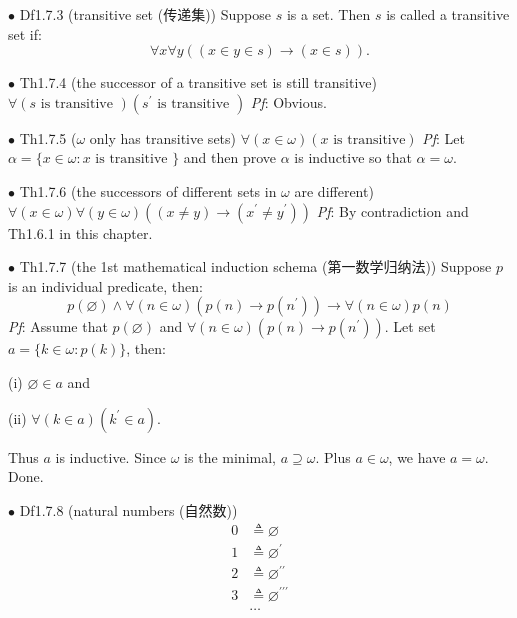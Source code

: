 \documentclass{article}
\begin{document}
\begin{Df}{$\bullet$ Df1.7.3 (transitive set (传递集))}
    Suppose $s$ is a set. Then $s$ is called a transitive set if: $$\forall x\forall y \left((x\in y\in s)\rightarrow (x\in s)\right).$$
\end{Df}

\begin{Th}{$\bullet$ Th1.7.4 (the successor of a transitive set is still transitive)}
    \textcolor{Th}{$\forall (s \text{ is transitive }) \left(s^\prime \text{ is transitive }\right)$}
    \tcblower
    \textit{Pf}: Obvious.
\end{Th}

\begin{Th}{$\bullet$ Th1.7.5 ($\omega$ only has transitive sets)}
    \textcolor{Th}{$\forall (x\in \omega) (x \text{ is transitive})$}
    \tcblower
    \textit{Pf}: Let $\alpha = \{x\in \omega: x \text{ is transitive }\}$ and then prove $\alpha$ is inductive so that $\alpha = \omega$.
\end{Th}

\begin{Th}{$\bullet$ Th1.7.6 (the successors of different sets in $\omega$ are different)}
    \textcolor{Th}{$\forall (x\in \omega) \forall (y\in \omega) \left((x\neq y)\rightarrow (x^\prime \neq y^\prime)\right)$}
    \tcblower
    \textit{Pf}: By contradiction and Th1.6.1 in this chapter.
\end{Th}

\begin{Th}{$\bullet$ Th1.7.7 (the 1st mathematical induction schema (第一数学归纳法))}
    \textcolor{Th}{Suppose $p$ is an individual predicate, then:
    $$p(\varnothing)\land \forall (n\in \omega) (p(n)\rightarrow p(n^\prime))\rightarrow \forall (n\in \omega)p(n)$$}
    \tcblower
    \textit{Pf}: Assume that $p(\varnothing)$ and $\forall (n\in \omega)(p(n)\rightarrow p(n^\prime))$. Let set $a = \{k\in \omega: p(k)\}$, then:
    \begin{compactenum}
        \item[(i)] $\varnothing\in a$ and
        \item[(ii)] $\forall (k\in a) (k^\prime\in a)$.
    \end{compactenum}
    Thus $a$ is inductive. Since $\omega$ is the minimal, $a\supseteq \omega$. Plus $a\in \omega$, we have $a=\omega$. Done.
\end{Th}

\begin{Df}{$\bullet$ Df1.7.8 (natural numbers (自然数))}
    \begin{align*}
        0 &\triangleq \varnothing\\
        1 &\triangleq \varnothing^\prime\\
        2 &\triangleq \varnothing^{\prime\prime}\\
        3 &\triangleq \varnothing^{\prime\prime\prime}\\
        &\dots
    \end{align*}
\end{Df}
\end{document}
